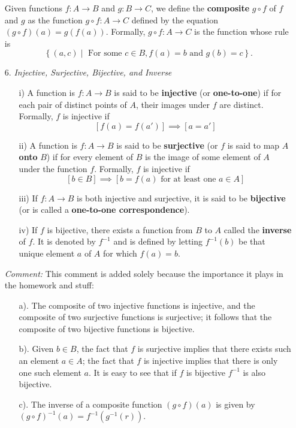 \begin{enumerate}
    Given functions $f: A \longrightarrow B$ and $g: B \longrightarrow C$, we define the {\bf composite} $g \circ f$ of $f$ and $g$ as the function $g \circ f: A \longrightarrow C$ defined by the equation $\left(g \circ f\right)(a) = g\left(f(a)\right)$. Formally, $g \circ f : A \longrightarrow C$ is the function whose rule is 
    $$\left\{(a,c) \mid \text{ For some $c \in B, f(a) = b$ and $g(b) =c$}\right\}.$$
    \item[6.] \emph{Injective, Surjective, Bijective, and Inverse}
    \begin{enumerate}
        \item[i)] A function is $f: A \longrightarrow B$ is said to be {\bf injective} (or {\bf one-to-one}) if for each pair of distinct points of $A$, their images under $f$ are distinct. Formally, $f$ is injective if 
        $$\left[f(a) = f(a')\right] \implies \left[a = a'\right]$$
        \item[ii)] A function is $f: A \longrightarrow B$ is said to be {\bf surjective} (or $f$ is said to map $A$ {\bf onto} $B$) if for every element of $B$ is the image of some element of $A$ under the function $f$. Formally, $f$ is injective if 
        $$\left[b \in B\right] \implies \left[b = f(a) \text{ for at least one } a \in A \right]$$
        \item[iii)] If $f: A \longrightarrow B$ is both injective and surjective, it is said to be {\bf bijective} (or is called a {\bf one-to-one correspondence}).
        \item[iv)] If $f$ is bijective, there exists a function from $B$ to $A$ called the {\bf inverse} of $f$. It is denoted by $f^{-1}$ and is defined by letting $f^{-1}(b)$ be that unique element $a$ of $A$ for which $f(a) = b$.
    \end{enumerate}
    \emph{Comment: }This comment is added solely because the importance it plays in the homework and stuff:\begin{enumerate}
        \item[a).] The composite of two injective functions is injective, and the composite of two surjective functions is surjective; it follows that the composite of two bijective functions is bijective.
        \item[b).] Given $b \in B$, the fact that $f$ is surjective implies that there exists such an element $a \in A$; the fact that $f$ is injective implies that there is only one such element $a$. It is easy to see that if $f$ is bijective $f^{-1}$ is also bijective.
        \item[c).] The inverse of a composite function $\left(g \circ f \right)(a)$ is given by $(g \circ f)^{-1}(a) = f^{-1}\left(g^{-1}(r)\right)$.

\end{enumerate}
\end{enumerate}

